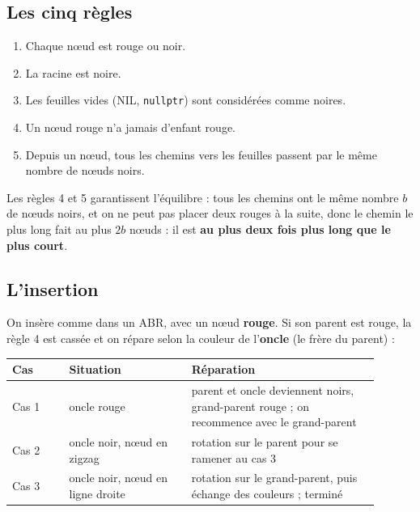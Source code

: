 \documentclass[12pt,a4paper]{report}
\begin{document}
\subsection{Les cinq règles}
\begin{enumerate}
  \item Chaque nœud est rouge ou noir.
  \item La racine est noire.
  \item Les feuilles vides (NIL, \texttt{nullptr}) sont considérées comme noires.
  \item Un nœud rouge n'a jamais d'enfant rouge.
  \item Depuis un nœud, tous les chemins vers les feuilles passent par le même nombre de nœuds noirs.
\end{enumerate}
Les règles 4 et 5 garantissent l'équilibre : tous les chemins ont le même nombre $b$ de nœuds noirs, et on ne peut pas placer deux rouges à la suite, donc le chemin le plus long fait au plus $2b$ nœuds : il est \textbf{au plus deux fois plus long que le plus court}.

\subsection{L'insertion}
On insère comme dans un ABR, avec un nœud \textbf{rouge}. Si son parent est rouge, la règle 4 est cassée et on répare selon la couleur de l'\textbf{oncle} (le frère du parent) :

\begin{center}
\small
\begin{tabular}{p{0.14\linewidth}p{0.30\linewidth}p{0.46\linewidth}}
  \toprule
  Cas & Situation & Réparation \\
  \midrule
  Cas 1 & oncle rouge & parent et oncle deviennent noirs, grand-parent rouge ; on recommence avec le grand-parent \\
  Cas 2 & oncle noir, nœud en zigzag & rotation sur le parent pour se ramener au cas 3 \\
  Cas 3 & oncle noir, nœud en ligne droite & rotation sur le grand-parent, puis échange des couleurs ; terminé \\
  \bottomrule
\end{tabular}
\end{center}
\end{document}
